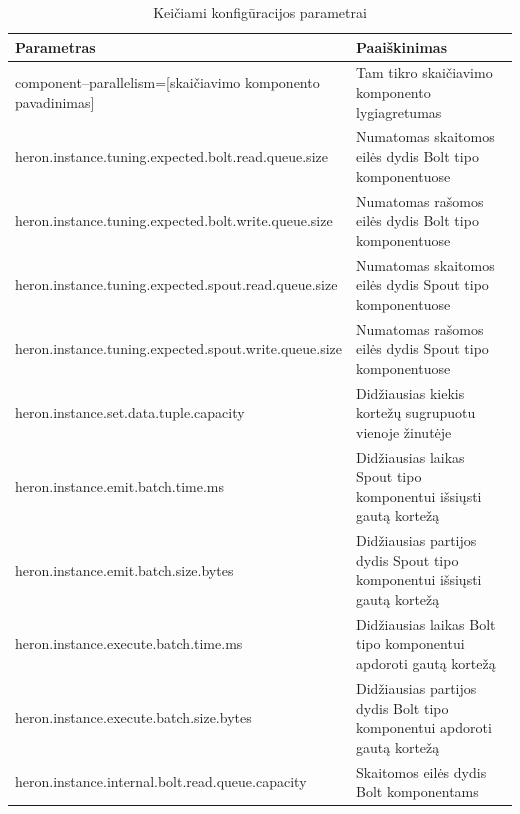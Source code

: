 \documentclass{VUMIFPSbakalaurinis}
\begin{document}
\begin{longtable}{|p{0.59\linewidth}|p{0.41\linewidth}|}
    \caption{Keičiami konfigūracijos parametrai}
    \label{param–table}\\
    \hline
    \rowcolor[HTML]{C0C0C0} 
    Parametras                                              & Paaiškinimas                                                                                 \\ \hline
    \endfirsthead
    \endhead
    component–parallelism=[skaičiavimo komponento pavadinimas]            & Tam tikro skaičiavimo komponento lygiagretumas                                 \\ \hline
    heron.instance.tuning.expected.bolt.read.queue.size                   & Numatomas skaitomos eilės dydis Bolt tipo komponentuose                        \\ \hline
    heron.instance.tuning.expected.bolt.write.queue.size                  & Numatomas rašomos eilės dydis Bolt tipo komponentuose                          \\ \hline
    heron.instance.tuning.expected.spout.read.queue.size                  & Numatomas skaitomos eilės dydis Spout tipo komponentuose                       \\ \hline
    heron.instance.tuning.expected.spout.write.queue.size                 & Numatomas rašomos eilės dydis Spout tipo komponentuose                         \\ \hline
    heron.instance.set.data.tuple.capacity                                & Didžiausias kiekis kortežų sugrupuotu vienoje žinutėje                        \\ \hline
    heron.instance.emit.batch.time.ms                                     & Didžiausias laikas Spout tipo komponentui išsiųsti gautą kortežą               \\ \hline
    heron.instance.emit.batch.size.bytes                                  & Didžiausias partijos dydis Spout tipo komponentui išsiųsti gautą kortežą       \\ \hline
    heron.instance.execute.batch.time.ms                                  & Didžiausias laikas Bolt tipo komponentui apdoroti gautą kortežą                \\ \hline
    heron.instance.execute.batch.size.bytes                               & Didžiausias partijos dydis Bolt tipo komponentui apdoroti gautą kortežą        \\ \hline
    heron.instance.internal.bolt.read.queue.capacity                      & Skaitomos eilės dydis Bolt komponentams                                        \\ \hline

\end{longtable}
\end{document}
